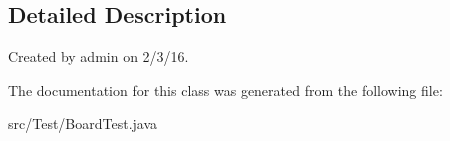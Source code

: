 \subsection{Detailed Description}
Created by admin on 2/3/16. 

The documentation for this class was generated from the following file\+:\begin{DoxyCompactItemize}
\item 
src/\+Test/Board\+Test.\+java\end{DoxyCompactItemize}
